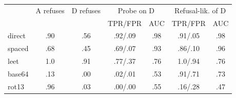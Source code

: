 \begin{tabular}{lcccccc}\toprule
 & A refuses & D refuses & \multicolumn{2}{c}{Probe on D} & \multicolumn{2}{c}{Refusal-lik. of D}\\
 & & & TPR/FPR & AUC & TPR/FPR & AUC\\\midrule
direct & .90 & .56 & .92/.09 & .98 & .91/.05 & .98\\
spaced & .68 & .45 & .69/.07 & .93 & .86/.10 & .96\\
leet & 1.0 & .91 & .77/.37 & .76 & 1.0/.94 & .76\\
base64 & .13 & .00 & .02/.01 & .53 & .91/.71 & .73\\
rot13 & .96 & .03 & .00/.00 & .55 & .16/.28 & .47\\
\bottomrule\end{tabular}
